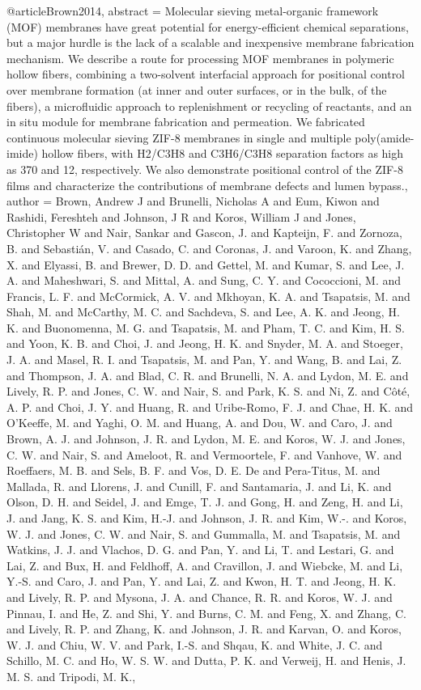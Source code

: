 @article{Brown2014,
abstract = {Molecular sieving metal-organic framework (MOF) membranes have great potential for energy-efficient chemical separations, but a major hurdle is the lack of a scalable and inexpensive membrane fabrication mechanism. We describe a route for processing MOF membranes in polymeric hollow fibers, combining a two-solvent interfacial approach for positional control over membrane formation (at inner and outer surfaces, or in the bulk, of the fibers), a microfluidic approach to replenishment or recycling of reactants, and an in situ module for membrane fabrication and permeation. We fabricated continuous molecular sieving ZIF-8 membranes in single and multiple poly(amide-imide) hollow fibers, with H2/C3H8 and C3H6/C3H8 separation factors as high as 370 and 12, respectively. We also demonstrate positional control of the ZIF-8 films and characterize the contributions of membrane defects and lumen bypass.},
author = {Brown, Andrew J and Brunelli, Nicholas A and Eum, Kiwon and Rashidi, Fereshteh and Johnson, J R and Koros, William J and Jones, Christopher W and Nair, Sankar and Gascon, J. and Kapteijn, F. and Zornoza, B. and Sebasti{\'{a}}n, V. and Casado, C. and Coronas, J. and Varoon, K. and Zhang, X. and Elyassi, B. and Brewer, D. D. and Gettel, M. and Kumar, S. and Lee, J. A. and Maheshwari, S. and Mittal, A. and Sung, C. Y. and Cococcioni, M. and Francis, L. F. and McCormick, A. V. and Mkhoyan, K. A. and Tsapatsis, M. and Shah, M. and McCarthy, M. C. and Sachdeva, S. and Lee, A. K. and Jeong, H. K. and Buonomenna, M. G. and Tsapatsis, M. and Pham, T. C. and Kim, H. S. and Yoon, K. B. and Choi, J. and Jeong, H. K. and Snyder, M. A. and Stoeger, J. A. and Masel, R. I. and Tsapatsis, M. and Pan, Y. and Wang, B. and Lai, Z. and Thompson, J. A. and Blad, C. R. and Brunelli, N. A. and Lydon, M. E. and Lively, R. P. and Jones, C. W. and Nair, S. and Park, K. S. and Ni, Z. and C{\^{o}}t{\'{e}}, A. P. and Choi, J. Y. and Huang, R. and Uribe-Romo, F. J. and Chae, H. K. and O'Keeffe, M. and Yaghi, O. M. and Huang, A. and Dou, W. and Caro, J. and Brown, A. J. and Johnson, J. R. and Lydon, M. E. and Koros, W. J. and Jones, C. W. and Nair, S. and Ameloot, R. and Vermoortele, F. and Vanhove, W. and Roeffaers, M. B. and Sels, B. F. and Vos, D. E. De and Pera-Titus, M. and Mallada, R. and Llorens, J. and Cunill, F. and Santamaria, J. and Li, K. and Olson, D. H. and Seidel, J. and Emge, T. J. and Gong, H. and Zeng, H. and Li, J. and Jang, K. S. and Kim, H.-J. and Johnson, J. R. and Kim, W.-. and Koros, W. J. and Jones, C. W. and Nair, S. and Gummalla, M. and Tsapatsis, M. and Watkins, J. J. and Vlachos, D. G. and Pan, Y. and Li, T. and Lestari, G. and Lai, Z. and Bux, H. and Feldhoff, A. and Cravillon, J. and Wiebcke, M. and Li, Y.-S. and Caro, J. and Pan, Y. and Lai, Z. and Kwon, H. T. and Jeong, H. K. and Lively, R. P. and Mysona, J. A. and Chance, R. R. and Koros, W. J. and Pinnau, I. and He, Z. and Shi, Y. and Burns, C. M. and Feng, X. and Zhang, C. and Lively, R. P. and Zhang, K. and Johnson, J. R. and Karvan, O. and Koros, W. J. and Chiu, W. V. and Park, I.-S. and Shqau, K. and White, J. C. and Schillo, M. C. and Ho, W. S. W. and Dutta, P. K. and Verweij, H. and Henis, J. M. S. and Tripodi, M. K.},
}
